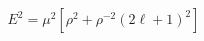 \begin{equation}                              
E^{2} = \mu^{2} [\rho^{2} + \rho^{-2} (2 \ell + 1)^{2}]                              
\end{equation} 
